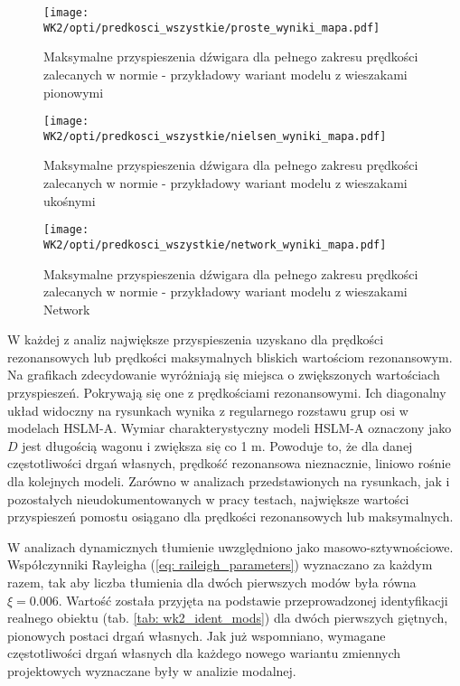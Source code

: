 \begin{figure}[hbt!]
	\centering
	\texttt{[image: WK2/opti/predkosci\_wszystkie/proste\_wyniki\_mapa.pdf]}
	\captionsetup{justification=centering}
\caption{Maksymalne przyspieszenia dźwigara dla pełnego zakresu prędkości zalecanych w normie - przykładowy wariant modelu z wieszakami pionowymi}
\label{fig:wk2_opti_proste_predkosci_test_all_proste}
\end{figure}
	
	
\begin{figure}[hbt!]
	\centering
	\texttt{[image: WK2/opti/predkosci\_wszystkie/nielsen\_wyniki\_mapa.pdf]}
	\captionsetup{justification=centering}
\caption{Maksymalne przyspieszenia dźwigara dla pełnego zakresu prędkości zalecanych w normie - przykładowy wariant modelu z wieszakami ukośnymi}
\label{fig:wk2_opti_proste_predkosci_test_all_nielsen}
\end{figure}
	
\begin{figure}[hbt!]
	\centering
	\texttt{[image: WK2/opti/predkosci\_wszystkie/network\_wyniki\_mapa.pdf]}	
	\captionsetup{justification=centering}
	\caption{Maksymalne przyspieszenia dźwigara dla pełnego zakresu prędkości zalecanych w normie - przykładowy wariant modelu z wieszakami Network}
	\label{fig:wk2_opti_proste_predkosci_test_all_network}
\end{figure}

W każdej z analiz największe przyspieszenia uzyskano dla prędkości rezonansowych lub prędkości maksymalnych bliskich wartościom rezonansowym. Na grafikach zdecydowanie wyróżniają się miejsca o zwiększonych wartościach przyspieszeń. Pokrywają się one z prędkościami rezonansowymi. Ich diagonalny układ widoczny na rysunkach wynika z regularnego rozstawu grup osi w modelach HSLM-A. Wymiar charakterystyczny modeli HSLM-A oznaczony jako $D$ jest długością wagonu i zwiększa się co 1 m. Powoduje to, że dla danej częstotliwości drgań własnych, prędkość rezonansowa nieznacznie, liniowo rośnie dla kolejnych modeli. Zarówno w analizach przedstawionych na rysunkach, jak i pozostałych nieudokumentowanych w pracy testach, największe wartości przyspieszeń pomostu osiągano dla prędkości rezonansowych lub maksymalnych.

W analizach dynamicznych tłumienie uwzględniono jako masowo-sztywnościowe. Współczynniki Rayleigha (\ref{eq: raileigh_parameters}) wyznaczano za każdym razem, tak aby liczba tłumienia dla dwóch pierwszych modów była równa $\xi=0.006$. Wartość została przyjęta na podstawie przeprowadzonej identyfikacji realnego obiektu (tab. \ref{tab: wk2_ident_mods}) dla dwóch pierwszych giętnych, pionowych postaci drgań własnych. Jak już wspomniano, wymagane częstotliwości drgań własnych dla każdego nowego wariantu zmiennych projektowych wyznaczane były w analizie modalnej.



